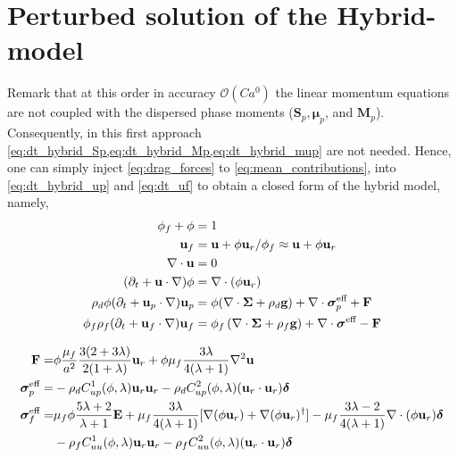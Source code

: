 



\section{Perturbed solution of the Hybrid-model}

Remark that at this order in accuracy $\mathcal{O}(Ca^0)$ the linear momentum equations are not coupled with the dispersed phase moments ($\textbf{S}_p,\bm\mu_p$, and $\textbf{M}_p$).  
Consequently, in this first approach \ref{eq:dt_hybrid_Sp,eq:dt_hybrid_Mp,eq:dt_hybrid_mup} are not needed.
Hence, one can simply inject \ref{eq:drag_forces} to \ref{eq:mean_contributions}, into  \ref{eq:dt_hybrid_up} and \ref{eq:dt_uf} to obtain a closed form of the hybrid model, namely,  
\begin{align}
    \label{eq:first}
    \phi_f + \phi &= 1\\
    \textbf{u}_f &= \textbf{u}  + \phi \textbf{u}_r/\phi_f \approx \textbf{u} + \phi \textbf{u}_r\\
    \div \textbf{u} &= 0 \\
    (\pddt + \textbf{u} \cdot \grad)\phi
    &= \div (\phi\textbf{u}_r)\\
    \rho_d \phi (\pddt + \textbf{u}_p \cdot \grad)\textbf{u}_p
    &=
    \phi(\div \bm\Sigma
    + \rho_d  \textbf{g})
    + \div \bm\sigma_p^\text{eff}
    + \textbf{F}
    \\
    \phi_f \rho_f(\pddt + \textbf{u}_f  \cdot \grad) \textbf{u}_f
    &= \phi_f 
    \left(\div \bm{\Sigma}
    + \rho_f \textbf{g}\right)
    + \div \bm\sigma^\text{eff}
    -\textbf{F}\\
    \label{eq:last}
\end{align}

\begin{align}
    \textbf{F}=&
    \phi
    \frac{\mu_f}{a^2}
    \frac{3(2+3\lambda)}{2(1+\lambda)}\textbf{u}_r
    + \phi\mu_f  \frac{3\lambda}{4(\lambda +1)} \grad^2 \textbf{u}\\
    \bm\sigma_p^\text{eff}
    =&
    -\rho_d C^1_{up}(\phi,\lambda) \textbf{u}_r \textbf{u}_r
    -\rho_d C^2_{up}(\phi,\lambda) (\textbf{u}_r \cdot \textbf{u}_r)\bm\delta\\
    \bm\sigma_f^\text{eff}
    =&
     \mu_f \phi \frac{5\lambda +2}{\lambda+1} \textbf{E}
    + \mu_f \frac{3\lambda}{4(\lambda+1)} [
    \grad(\phi \textbf{u}_r)
    + \grad(\phi \textbf{u}_r)^\dagger]
    - \mu_f \frac{3\lambda - 2}{4(\lambda+1)} \div(\phi \textbf{u}_r)  \bm\delta\nonumber\\
    &-\rho_f C^1_{uu}(\phi,\lambda)  \textbf{u}_r \textbf{u}_r
    -\rho_f C^2_{uu} (\phi,\lambda) (\textbf{u}_r \cdot \textbf{u}_r)\bm\delta
    \label{eq:sigma_feffff}
\end{align}

